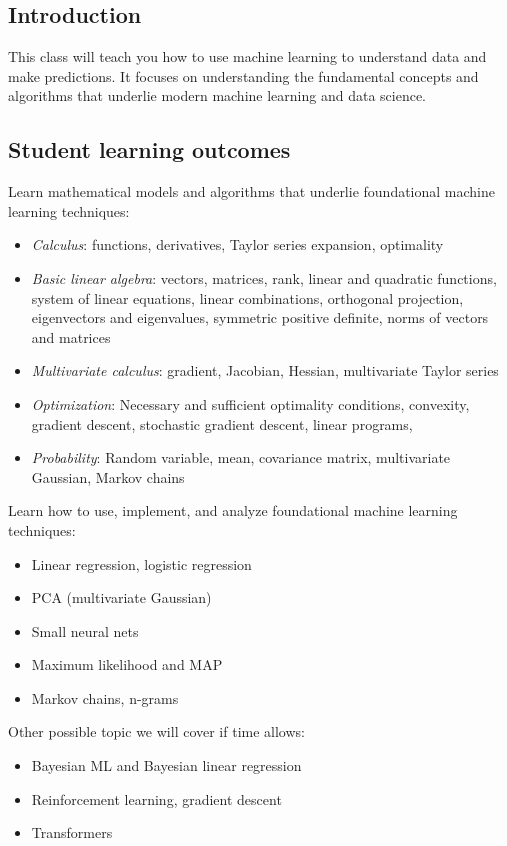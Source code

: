 \documentclass[11pt]{article}
\begin{document}
\subsection{Introduction}
This class will teach you how to use machine learning to understand data and make predictions. It focuses on understanding the fundamental concepts and algorithms that underlie modern machine learning and data science.

\subsection{Student learning outcomes}

Learn mathematical models and algorithms that underlie foundational machine learning techniques:
\begin{itemize}
\item \emph{Calculus}: functions, derivatives, Taylor series expansion, optimality
\item \emph{Basic linear algebra}: vectors, matrices, rank, linear and quadratic functions, system of linear equations, linear combinations, orthogonal projection, eigenvectors and eigenvalues, symmetric positive definite, norms of vectors and matrices
\item  \emph{Multivariate calculus}: gradient, Jacobian, Hessian, multivariate Taylor series
\item  \emph{Optimization}: Necessary and sufficient optimality conditions, convexity, gradient descent, stochastic gradient descent, linear programs, 
\item \emph{Probability}: Random variable, mean, covariance matrix, multivariate Gaussian, Markov chains
\end{itemize}

Learn how to use, implement, and analyze foundational machine learning techniques:
\begin{itemize}
\item Linear regression, logistic regression
\item PCA (multivariate Gaussian)
\item Small neural nets
\item Maximum likelihood and MAP
\item Markov chains, n-grams
\end{itemize}

Other possible topic we will cover if time allows:
\begin{itemize}
\item Bayesian ML and Bayesian linear regression
\item Reinforcement learning, gradient descent
\item Transformers
\end{itemize}
\end{document}
